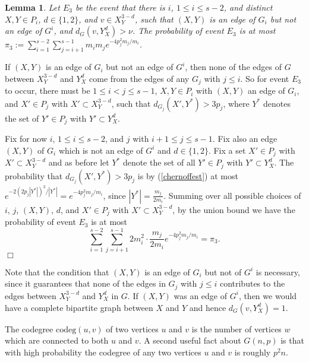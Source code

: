 \documentclass[11pt]{article}
\newtheorem{lemma}{Lemma}[section]
\newenvironment{proof}
      {\medskip\noindent{\bf Proof:}\hspace{1mm}}
      {\hfill$\Box$\medskip}
\begin{document}
\begin{lemma}\label{E2}
Let $E_3$ be the event that there is $i$, $1 \leq i \leq s-2$, and distinct
$X,Y \in P_i$, $d \in \{1,2\}$, and $v \in X^{3-d}_Y$, such that $(X,Y)$ is an
edge of $G_i$ but not an edge of $G^i$, and  $d_{G}(v,Y^d_X) > \nu$. The
probability of event $E_3$ is at most
$\pi_3:=\sum_{i=1}^{s-2}\sum_{j=i+1}^{s-1}m_im_je^{-4p_j^2m_j/m_i}$.
\end{lemma}
\begin{proof}
If $(X,Y)$ is an edge of $G_i$ but not an edge of $G^i$, then none of the edges
of $G$ between $X^{3-d}_Y$ and $Y^d_X$ come from the edges of any $G_j$ with $j
\leq i$. So for event $E_3$ to occur, there must be $1 \leq i < j \leq s-1$,
$X, Y \in P_i$ with $(X,Y)$ an edge of $G_i$, and $X' \in P_j$ with $X' \subset
X_Y^{3-d}$, such that $d_{G_j}(X',Y^*)>3p_j$, where $Y^*$ denotes the set of
$Y' \in P_j$ with $Y' \subset Y_X^{d}$.

Fix for now $i$, $1 \leq i \leq s-2$, and $j$ with $i+1 \leq j \leq s-1$. Fix
also an edge $(X,Y)$  of $G_i$ which is not an edge of $G^i$ and $d \in
\{1,2\}$. Fix a set $X' \in P_j$ with $X' \subset X^{3-d}_Y$ and as before let
$Y^*$
denote the set of all $Y' \in P_j$ with $Y' \subset Y^d_X$. The probability
that $d_{G_j}(X',Y^*) > 3p_j$ is by (\ref{chernoffest}) at most
$e^{-2(2p_j|Y^*|)^2/|Y^*|}=e^{-4p_j^2 m_j/m_i}$, since $|Y^*| =
\frac{m_j}{2m_i}$. Summing over all possible
choices of $i$, $j$, $(X,Y)$, $d$, and $X' \in P_j$ with $X' \subset
X^{3-d}_Y$, by the union bound we have the probability of event $E_3$ is at
most
$$\sum_{i=1}^{s-2}\sum_{j=i+1}^{s-1}2m_i^2 \cdot \frac{m_j}{2m_i}e^{-4p_j^2
m_j/m_i} = \pi_3.$$
\end{proof}

Note that the condition that $(X,Y)$ is an edge of $G_i$ but not of $G^i$ is
necessary, since it guarantees that none of the edges in $G_j$ with $j \leq i$
contributes to the edges between $X^{3-d}_Y$ and $Y^d_X$ in $G$. If $(X,Y)$ was
an edge of $G^i$, then we would have a complete bipartite graph between $X$ and
$Y$ and hence $d_G(v, Y_X^d) = 1$.

The codegree $\textrm{codeg}(u,v)$ of two vertices $u$ and $v$ is the number of
vertices $w$ which are connected to both $u$ and $v$. A second useful fact
about $G(n,p)$ is that with high probability the codegree of any two vertices
$u$ and $v$ is roughly $p^2 n$.
\end{document}
